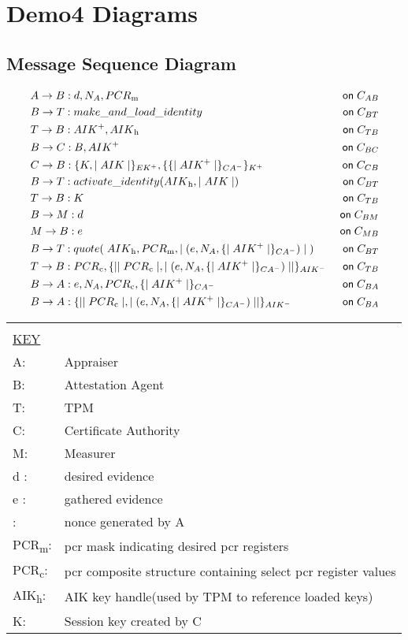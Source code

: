 \documentclass[10pt]{article}
\def \pmask {PCR\textsubscript{m}}
\def \pcomp {PCR\textsubscript{c}}
\def \evd {d}
\def \eve {e}
\def \cacert {\sign {\public{AIK}}{CA}}
\def \exdata {\hash{(\eve, \nonce{A}, \cacert ) }}
\def \aikh {AIK\textsubscript{h}}
\def \app {A}
\def \att {B}
\def \ca {C}
\def \mea {M}
\def \tp {T}
\def \k {K}
\begin{document}
\section{Demo4 Diagrams}

\subsection{Message Sequence Diagram}

\begin{align*}
  & \sndmsg {\app}{\att} {\evd, \nonce{\app}, \pmask} {\channel {\app \att}}  & \\
  & \sndmsg{\att}{\tp} {make\_and\_load\_identity} {\channel {\att \tp}} & \\
  & \sndmsg{\tp}{\att} {\public{AIK}, \aikh} {\channel {\tp \att}} & \\
  & \sndmsg{\att}{\ca} {\att, \public{AIK}} {\channel {\att \ca}} & \\
  & \sndmsg{\ca}{\att} {\encrypt{K, \hash{AIK}}{EK}, \encrypt{\cacert}{K}} {\channel {\ca \att}}& \\
  & \sndmsg{\att}{\tp} {activate\_identity({\aikh, \hash{AIK})}} {\channel {\att \tp}} & \\
  & \sndmsg{\tp}{\att} {K} {\channel {\tp \att}} & \\
  & \sndmsg{\att}{\mea} {\evd} {\channel {\att \mea}} & \\
  & \sndmsg{\mea}{\att} {\eve} {\channel {\mea \att}} & \\
  & \sndmsg{\att}{\tp} {quote(\;{AIK\textsubscript{h}, \pmask, \exdata}\;)} {\channel {\att \tp}} & \\
  & \sndmsg{\tp}{\att} {\pcomp, \sign{\hash{\pcomp}, \exdata}{AIK}} {\channel {\tp \att}} & \\
  & \sndmsg{\att}{\app} {\eve, \nonce{\app}, \pcomp, \cacert} {\channel {\att \app}} & \\
  & \sndmsg{\att}{\app} {\sign{\hash{\pcomp}, \exdata}{AIK}} {\channel {\att \app}} & 
\end{align*}

\begin{tabular}{l  l}
\\
\\
\underline{KEY}  \\
\app  :  &  Appraiser\\
\att  :  &  Attestation Agent\\
\tp  :  &  TPM\\
\ca  :  &  Certificate Authority\\
\mea  :  &  Measurer\\
d : & desired evidence \\
e : & gathered evidence \\
\nonce{\app} : & nonce generated by \app \\
\pmask : & pcr mask indicating desired pcr registers \\
\pcomp  : & pcr composite structure containing select pcr register values \\
\aikh : & AIK key handle(used by TPM to reference loaded keys) \\
\k : & Session key created by \ca \\
\end{tabular}
\end{document}
